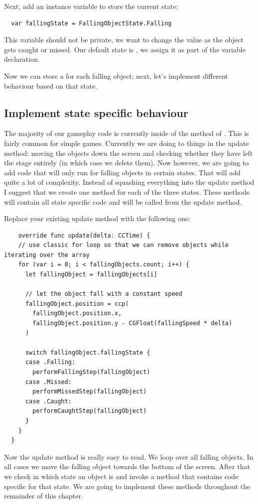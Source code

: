 \begin{leftbar}
Next, add an instance variable to store the current state:
\begin{lstlisting}
  var fallingState = FallingObjectState.Falling
\end{lstlisting}
\end{leftbar}
This variable should not be private, we want to change the value as
the object gets caught or missed. Our default state is , we
assign it as part of the variable declaration.

Now we can store a  for each falling object; next,
let's implement different behaviour based on that state.

\subsection{Implement state specific behaviour}
The majority of our gameplay code is currently inside of the 
method of . This is fairly common for simple games.
Currently we are doing to things in the update method: moving the objects down
the screen and checking whether they have left the stage entirely (in which
case we delete them). Now however, we are going to add code that will only run
for falling objects in certain states. That will add quite a lot of complexity.
Instead of squashing everything into the update method I suggest that we
create one method for each of the three states. These methods will contain
all state specific code and will be called from the update method.

\begin{leftbar}
Replace your existing update method with the following one:
\begin{lstlisting}
    override func update(delta: CCTime) {
    // use classic for loop so that we can remove objects while iterating over the array
    for (var i = 0; i < fallingObjects.count; i++) {
      let fallingObject = fallingObjects[i]
      
      // let the object fall with a constant speed
      fallingObject.position = ccp(
        fallingObject.position.x,
        fallingObject.position.y - CGFloat(fallingSpeed * delta)
      )
      
      switch fallingObject.fallingState {
      case .Falling:
        performFallingStep(fallingObject)
      case .Missed:
        performMissedStep(fallingObject)
      case .Caught:
        performCaughtStep(fallingObject)
      }
    }
  }
\end{lstlisting}
\end{leftbar} 
Now the update method is really easy to read. We loop over all falling objects.
In all cases we move the falling object towards the bottom of the screen. After
that we check in which state an object is and invoke a method that contains code
specific for that state. We are going to implement these methods throughout the
remainder of this chapter.

